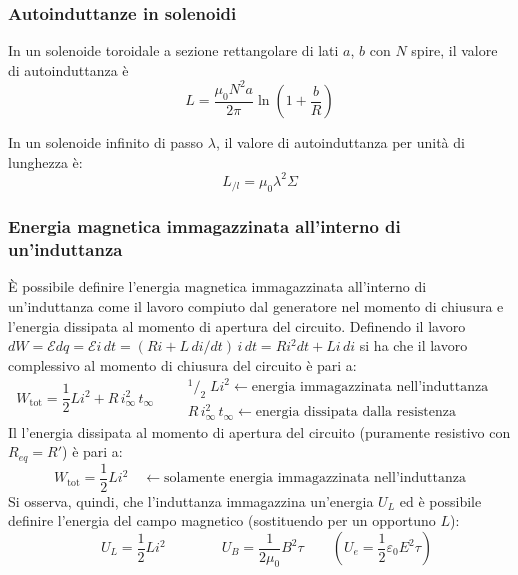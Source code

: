 \documentclass[a4paper]{article}
\begin{document}
\subsubsection*{Autoinduttanze in solenoidi}
In un solenoide toroidale a sezione rettangolare di lati \(a\), \(b\) con \(N\) spire, il valore di autoinduttanza è
\[L = \frac{\mu_0 N^2 a}{2 \pi} \ln \left( 1+ \frac{b}{R} \right)\]

In un solenoide infinito di passo \(\lambda\), il valore di autoinduttanza per unità di lunghezza è:
\[L_{/l} = \mu_0 \lambda^2 \Sigma\]

\subsubsection*{Energia magnetica immagazzinata all'interno di un'induttanza}
È possibile definire l'energia magnetica immagazzinata all'interno di un'induttanza come il lavoro compiuto dal generatore nel
momento di chiusura e l'energia dissipata al momento di apertura del circuito.
Definendo il lavoro \(dW = \mathcal{E} dq = \mathcal{E} i \, dt = (R i + L \, di / dt) \, i \, dt = R i^2 dt + L i \, di\) si ha
che il lavoro complessivo al momento di chiusura del circuito è pari a:
\[W_\text{tot} = \frac{1}{2} Li^2 + R \, i_\infty^2 \, t_\infty \qquad \begin{matrix}
	^1\!/_2 \; Li^2 \leftarrow \text{energia immagazzinata nell'induttanza}\\[5pt]
	R \, i_\infty^2 \, t_\infty \leftarrow \text{energia dissipata dalla resistenza} \qquad\quad
\end{matrix}\]
Il l'energia dissipata al momento di apertura del circuito (puramente resistivo con \(R_{eq} = R'\)) è pari a:
\[W_\text{tot} = \frac{1}{2} Li^2 \quad \leftarrow \text{solamente energia immagazzinata nell'induttanza}\]
Si osserva, quindi, che l'induttanza immagazzina un'energia \(U_L\) ed è possibile definire l'energia del campo magnetico
(sostituendo per un opportuno \(L\)):
\[ \quad U_L = \frac{1}{2} Li^2 \qquad\qquad U_B = \frac{1}{2\mu_0} B^2 \tau \qquad \left(U_e = \frac{1}{2}\varepsilon_0 E^2 \tau\right)\]
\end{document}
